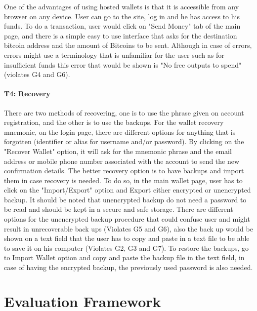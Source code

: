 One of the advantages of using hosted wallets is that it is accessible from any browser on any device. User can go to the site, log in and he has access to his funds. To do a transaction, user would click on "Send Money" tab of the main page, and there is a simple easy to use interface that asks for the destination bitcoin address and the amount of Bitcoins to be sent. Although in case of errors, errors might use a terminology that is unfamiliar for the user such as for insufficient funds this error that would be shown is "No free outputs to spend" (violates G4 and G6).

\paragraph{T4: Recovery}

There are two methods of recovering, one is to use the phrase given on account registration, and the other is to use the backups. For the wallet recovery mnemonic, on the login page, there are different options for anything that is forgotten (identifier or alias for username and/or password). By clicking on the "Recover Wallet" option, it will ask for the mnemonic phrase and the email address or mobile phone number associated with the account to send the new confirmation details. The better recovery option is to have backups and import them in case recovery is needed. To do so, in the main wallet page, user has to click on the "Import/Export" option and Export either encrypted or unencrypted backup. It should be noted that unencrypted backup do not need a password to be read and should be kept in a secure and safe storage. There are different options for the unencrypted backup procedure that could confuse user and might result in unrecoverable back ups (Violates G5 and G6), also the back up would be shown on a text field that the user has to copy and paste in a text file to be able to save it on his computer (Violates G2, G3 and G7). To restore the backups, go to Import Wallet option and copy and paste the backup file in the text field, in case of having the encrypted backup, the previously used password is also needed. 



\section{Evaluation Framework}


